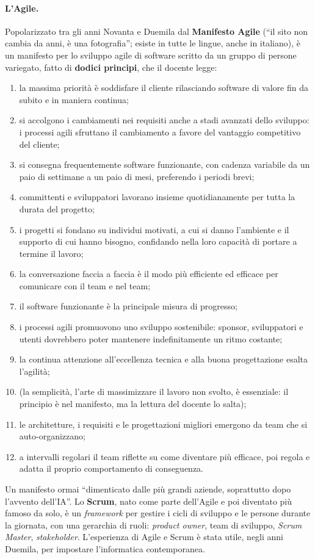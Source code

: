 \paragraph{L'Agile.} Popolarizzato tra gli anni Novanta e Duemila dal \textbf{Manifesto
Agile} (``il sito non cambia da anni, è una fotografia''; esiste in tutte le lingue,
anche in italiano), è un manifesto per lo sviluppo agile di software scritto da un gruppo
di persone variegato, fatto di \textbf{dodici principi}, che il docente legge:
\begin{enumerate}
  \item la massima priorità è soddisfare il cliente rilasciando software di valore fin
        da subito e in maniera continua;
  \item si accolgono i cambiamenti nei requisiti anche a stadi avanzati dello sviluppo:
        i processi agili sfruttano il cambiamento a favore del vantaggio competitivo del
        cliente;
  \item si consegna frequentemente software funzionante, con cadenza variabile da un
        paio di settimane a un paio di mesi, preferendo i periodi brevi;
  \item committenti e sviluppatori lavorano insieme quotidianamente per tutta la durata
        del progetto;
  \item i progetti si fondano su individui motivati, a cui si danno l'ambiente e il
        supporto di cui hanno bisogno, confidando nella loro capacità di portare a
        termine il lavoro;
  \item la conversazione faccia a faccia è il modo più efficiente ed efficace per
        comunicare con il team e nel team;
  \item il software funzionante è la principale misura di progresso;
  \item i processi agili promuovono uno sviluppo sostenibile: sponsor, sviluppatori e
        utenti dovrebbero poter mantenere indefinitamente un ritmo costante;
  \item la continua attenzione all'eccellenza tecnica e alla buona progettazione esalta
        l'agilità;
  \item (la semplicità, l'arte di massimizzare il lavoro non svolto, è essenziale: il
        principio è nel manifesto, ma la lettura del docente lo salta);
  \item le architetture, i requisiti e le progettazioni migliori emergono da team che si
        auto-organizzano;
  \item a intervalli regolari il team riflette su come diventare più efficace, poi
        regola e adatta il proprio comportamento di conseguenza.
\end{enumerate}
Un manifesto ormai ``dimenticato dalle più grandi aziende, soprattutto dopo l'avvento
dell'IA''. Lo \textbf{Scrum}, nato come parte dell'Agile e poi diventato più famoso da
solo, è un \emph{framework} per gestire i cicli di sviluppo e le persone durante la
giornata, con una gerarchia di ruoli: \emph{product owner}, team di sviluppo,
\emph{Scrum Master}, \emph{stakeholder}. L'esperienza di Agile e Scrum è stata utile, negli
anni Duemila, per impostare l'informatica contemporanea.

